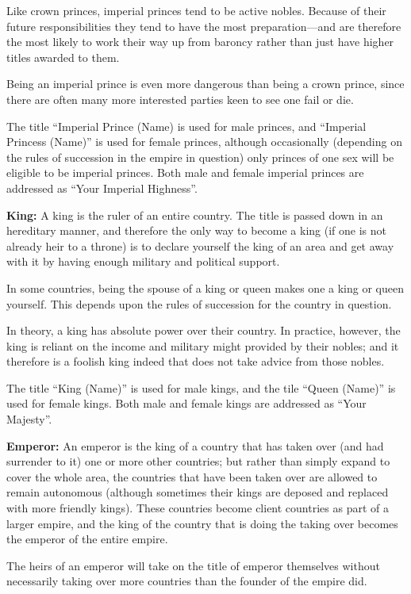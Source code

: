 \begin{multicols*}{2}
Like crown princes, imperial princes tend to be active nobles. Because of their future responsibilities they tend to have the most preparation—and are therefore the most likely to work their way up from baroncy rather than just have higher titles awarded to them.

Being an imperial prince is even more dangerous than being a crown prince, since there are often many more interested parties keen to see one fail or die.

The title “Imperial Prince (Name) is used for male princes, and “Imperial Princess (Name)” is used for female princes, although occasionally (depending on the rules of succession in the empire in question) only princes of one sex will be eligible to be imperial princes. Both male and female imperial princes are addressed as “Your Imperial Highness”.

\textbf{King:} A king is the ruler of an entire country. The title is passed down in an hereditary manner, and therefore the only way to become a king (if one is not already heir to a throne) is to declare yourself the king of an area and get away with it by having enough military and political support.

In some countries, being the spouse of a king or queen makes one a king or queen yourself. This depends upon the rules of succession for the country in question.

In theory, a king has absolute power over their country. In practice, however, the king is reliant on the income and military might provided by their nobles; and it therefore is a foolish king indeed that does not take advice from those nobles.

The title “King (Name)” is used for male kings, and the tile “Queen (Name)” is used for female kings. Both male and female kings are addressed as “Your Majesty”.

\textbf{Emperor:} An emperor is the king of a country that has taken over (and had surrender to it) one or more other countries; but rather than simply expand to cover the whole area, the countries that have been taken over are allowed to remain autonomous (although sometimes their kings are deposed and replaced with more friendly kings). These countries become client countries as part of a larger empire, and the king of the country that is doing the taking over becomes the emperor of the entire empire.

The heirs of an emperor will take on the title of emperor themselves without necessarily taking over more countries than the founder of the empire did.


\end{multicols*}
